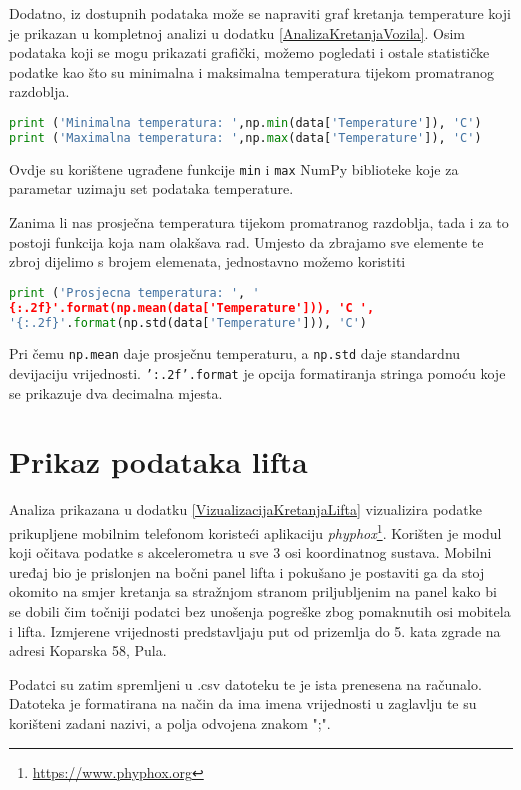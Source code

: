 Dodatno, iz dostupnih podataka može se napraviti graf kretanja temperature koji je prikazan u kompletnoj analizi u dodatku \ref{AnalizaKretanjaVozila}.
Osim podataka koji se mogu prikazati grafički, možemo pogledati i ostale statističke podatke kao što su minimalna i maksimalna temperatura tijekom promatranog razdoblja.
\begin{lstlisting}[language=Python]
print ('Minimalna temperatura: ',np.min(data['Temperature']), 'C')
print ('Maximalna temperatura: ',np.max(data['Temperature']), 'C')
\end{lstlisting}
Ovdje su korištene ugrađene funkcije \texttt{min} i \texttt{max} NumPy biblioteke koje za parametar uzimaju set podataka temperature.

Zanima li nas prosječna temperatura tijekom promatranog razdoblja, tada i za to postoji funkcija koja nam olakšava rad.
Umjesto da zbrajamo sve elemente te zbroj dijelimo s brojem elemenata, jednostavno možemo koristiti
\begin{lstlisting}[language=Python]
print ('Prosjecna temperatura: ', '
{:.2f}'.format(np.mean(data['Temperature'])), 'C ',
'{:.2f}'.format(np.std(data['Temperature'])), 'C')
\end{lstlisting}
Pri čemu \texttt{np.mean} daje prosječnu temperaturu, a \texttt{np.std} daje standardnu devijaciju vrijednosti.
\texttt{'{:.2f}'.format} je opcija formatiranja stringa pomoću koje se prikazuje dva decimalna mjesta.

\section{Prikaz podataka lifta}
Analiza prikazana u dodatku \ref{VizualizacijaKretanjaLifta} vizualizira podatke prikupljene mobilnim telefonom koristeći aplikaciju \textit{phyphox}\footnote{\url{https://www.phyphox.org}}.
Korišten je modul koji očitava podatke s akcelerometra u sve 3 osi koordinatnog sustava.
Mobilni uređaj bio je prislonjen na bočni panel lifta i pokušano je postaviti ga da stoj okomito na smjer kretanja sa stražnjom stranom priljubljenim na panel kako bi se dobili čim točniji podatci bez unošenja pogreške zbog pomaknutih osi mobitela i lifta.
Izmjerene vrijednosti predstavljaju put od prizemlja do 5. kata zgrade na adresi Koparska 58, Pula.

Podatci su zatim spremljeni u .csv datoteku te je ista prenesena na računalo.
Datoteka je formatirana na način da ima imena vrijednosti u zaglavlju te su korišteni zadani nazivi, a polja odvojena znakom ";".
